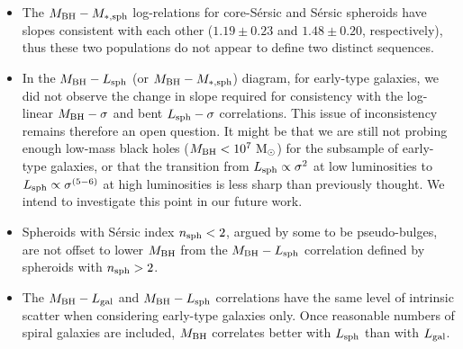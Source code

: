 \documentclass[preprint2]{emulateapj}
\begin{document}
\begin{itemize}
     
\item The $M_{\rm BH} - M_{\rm *,sph}$ log-relations for core-S\'ersic and S\'ersic spheroids have slopes consistent with each other 
      ($1.19 \pm 0.23$ and $1.48 \pm 0.20$, respectively), 
      thus these two populations do not appear to define two distinct sequences. 
\item In the $M_{\rm BH} - L_{\rm sph}$ (or $M_{\rm BH} - M_{\rm *,sph}$) diagram, for early-type galaxies, 
      we did not observe the change in slope required for consistency with the log-linear $M_{\rm BH} - \sigma$ and bent $L_{\rm sph} - \sigma$ correlations.
      This issue of inconsistency remains therefore an open question. 
      It might be that we are still not probing enough low-mass black holes ($M_{\rm BH} < 10^7\rm~M_\odot$) 
      for the subsample of early-type galaxies, 
      or that the transition from  $L_{\rm sph} \propto \sigma^2$ at low luminosities to $L_{\rm sph} \propto \sigma^{(5-6)}$ at high luminosities 
      is less sharp than previously thought.
      We intend to investigate this point in our future work. 
\item Spheroids with S\'ersic index $n_{\rm sph}<2$, argued by some to be pseudo-bulges, 
      are not offset to lower $M_{\rm BH}$ from the $M_{\rm BH} - L_{\rm sph}$ correlation defined by spheroids with $n_{\rm sph}>2$. 
\item The $M_{\rm BH} - L_{\rm gal}$ and $M_{\rm BH} - L_{\rm sph}$ correlations have the same level of intrinsic scatter 
      when considering early-type galaxies only. 
      Once reasonable numbers of spiral galaxies are included, 
      $M_{\rm BH}$ correlates better with $L_{\rm sph}$ than with $L_{\rm gal}$. 
\end{itemize} 
\end{document}
